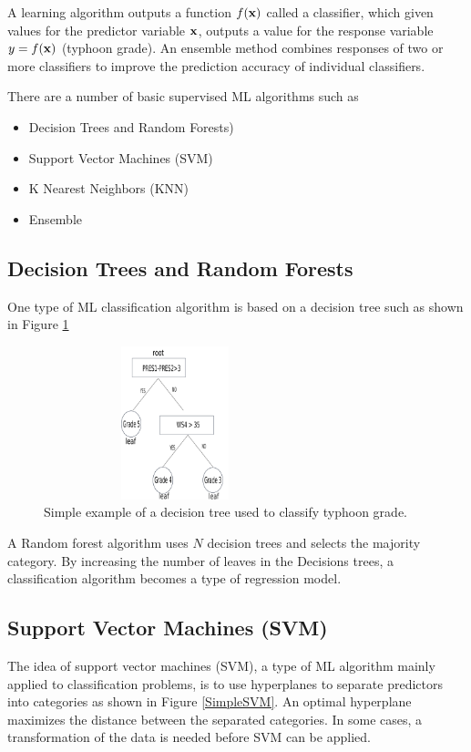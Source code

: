 \documentclass{SBCbookchapter}
\begin{document}
A learning algorithm outputs a function $f({\bf x})$ called a classifier, which given values for the predictor variable ${\bf x}$, outputs a value for the response variable $y=f({\bf x})$ (typhoon grade).  An ensemble method combines responses of two or more classifiers to improve the prediction accuracy of individual classifiers. 

There are a number of basic supervised ML algorithms \cite{Bon} such as

\begin{itemize}
    \item Decision Trees and Random Forests)
    \item Support Vector Machines (SVM)
    \item K Nearest Neighbors (KNN)
    \item Ensemble
\end{itemize}

\subsection{Decision Trees and Random Forests}

One type of ML classification algorithm is based on a decision tree such as shown in Figure \ref{SimpleDecTree}  

\begin{figure}[!htpb]
	\centering
	\includegraphics[width=3in,height=1.75in]{SimpleDecTree.png}
	\caption{Simple example of a decision tree used to classify typhoon grade.}
	\label{SimpleDecTree}
\end{figure}

A Random forest algorithm uses $N$ decision trees and selects the majority category. By increasing the number of leaves in the Decisions trees, a classification algorithm becomes a type of regression model.

\subsection{Support Vector Machines (SVM)}
The idea of support vector machines (SVM), a type of ML algorithm mainly applied to classification problems,  is to use hyperplanes to separate predictors into categories as shown in Figure \ref{SimpleSVM}. An optimal hyperplane maximizes the distance between the separated categories. In some cases, a transformation of the data is needed before SVM can be applied. 
\end{document}
